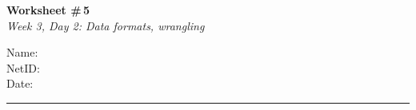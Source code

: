 \documentclass[11pt]{article}
\begin{document}
\noindent
\begin{minipage}[t]{0.55\textwidth}
  \vspace{0pt}
  {\LARGE \textbf{Worksheet \#\,5}} \\[0.3em]
  {\large \textit{Week 3, Day 2: Data formats, wrangling}}
\end{minipage}
\hfill
\begin{minipage}[t]{0.40\textwidth}
  \vspace{0pt}
  \begin{mdframed}[linecolor=black, linewidth=1pt, innertopmargin=10pt, innerbottommargin=10pt]
    \small
    \vspace{0.4cm}
    Name: \underline{\hspace{4.5cm}} \\[1em]
    NetID: \underline{\hspace{4.3cm}} \\[1em]
    Date: \underline{\hspace{4.4cm}} \\
  \end{mdframed}
\end{minipage}

\vspace{1em}
\noindent\rule{\linewidth}{1pt}
\vspace{0.2em}
\end{document}
